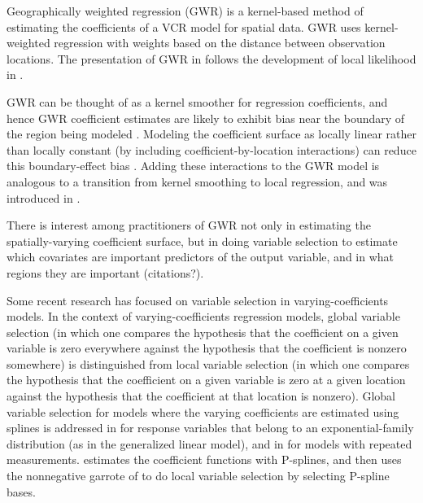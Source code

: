 \documentclass[authoryear, review, 11pt]{elsarticle}
\begin{document}
	Geographically weighted regression (GWR) \citep{Fotheringham:2002} is a kernel-based method of estimating the coefficients of a VCR model for spatial data. GWR uses kernel-weighted regression with weights based on the distance between observation locations. The presentation of GWR in \cite{Fotheringham:2002} follows the development of local likelihood in \cite{Loader:1999}.
	
	GWR can be thought of as a kernel smoother for regression coefficients, and hence GWR coefficient estimates are likely to exhibit bias near the boundary of the region being modeled \citep{Hastie:1993b}. Modeling the coefficient surface as locally linear rather than locally constant (by including coefficient-by-location interactions) can reduce this boundary-effect bias \citep{Hastie:1993b}. Adding these interactions to the GWR model is analogous to a transition from kernel smoothing to local regression, and was introduced in \cite{Wang:2008b}.
	
	There is interest among practitioners of GWR not only in estimating the spatially-varying coefficient surface, but in doing variable selection to estimate which covariates are important predictors of the output variable, and in what regions they are important (citations?).
	
	Some recent research has focused on variable selection in varying-coefficients models. In the context of varying-coefficients regression models, global variable selection (in which one compares the hypothesis that the coefficient on a given variable is zero everywhere against the hypothesis that the coefficient is nonzero somewhere) is distinguished from local variable selection (in which one compares the hypothesis that the coefficient on a given variable is zero at a given location against the hypothesis that the coefficient at that location is nonzero). Global variable selection for models where the varying coefficients are estimated using splines is addressed in \cite{Fan:1999} for response variables that belong to an exponential-family distribution (as in the generalized linear model), and in \cite{Wang:2008a} for models with repeated measurements. \cite{Antoniadis:2012a} estimates the coefficient functions with P-splines, and then uses the nonnegative garrote of \cite{Breiman:1995} to do local variable selection by selecting P-spline bases.
	
\end{document}
